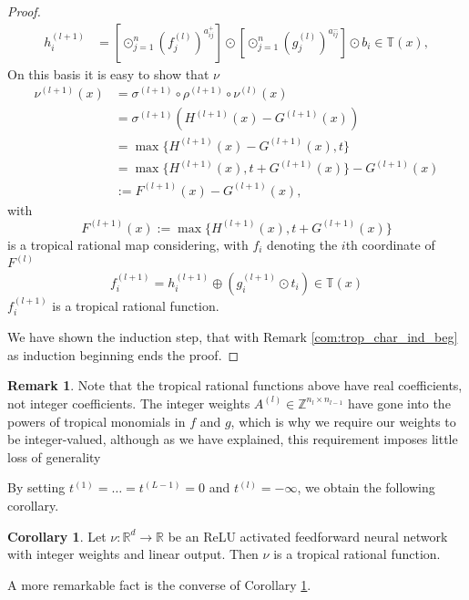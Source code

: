 \documentclass{article}
\theoremstyle{definition}
\newtheorem{corollary}[theorem]{Corollary}
\newtheorem{remark}[theorem]{Remark}
\begin{document}
\begin{proof}
\begin{align*}
h_{i}^{(l+1)} &= [\odot^{n}_{j=1}(f_j^{(l)})^{a_{ij}^{+}}] \odot [\odot^{n}_{j=1}(g_j^{(l)})^{a_{ij}^{-}}] \odot b_{i} \in \mathbb{T}(x),
\end{align*}
On this basis it is easy to show that $\nu$
\begin{align*}
\nu^{(l+1)}(x) 
&= \sigma^{(l+1)} \circ \rho^{(l+1)} \circ \nu^{(l)}(x) \\
&= \sigma^{(l+1)} (H^{(l+1)}(x) - G^{(l+1)}(x)) \\
&= \max\{ H^{(l+1)}(x) - G^{(l+1)}(x), t\} \\
&= \max\{ H^{(l+1)}(x), t + G^{(l+1)}(x)\} - G^{(l+1)}(x) \\
&:= F^{(l+1)}(x) - G^{(l+1)}(x),
\end{align*}
with
$$F^{(l+1)}(x) := \max\{ H^{(l+1)}(x), t + G^{(l+1)}(x)\}$$
is a tropical rational map considering, with $f_{i}$ denoting the $i$th coordinate of $F^{(l)}$
$$f_{i}^{(l+1)} = h_{i}^{(l+1)} \oplus (g_{i}^{(l+1)} \odot t_{i}) \in \mathbb{T}(x)$$
$f_{i}^{(l+1)}$ is a tropical rational function.

We have shown the induction step, that with Remark \ref{com:trop_char_ind_beg} as induction beginning ends the proof.
\end{proof}

\begin{remark}\cite{zhang2018tropical}
Note that the tropical rational functions above have real coefficients, not integer coefficients. The integer weights $A^{(l)} \in \mathbb{Z}^{n_l \times n_{l-1}}$ have gone into the powers of tropical monomials in $f$ and $g$, which is why we require our weights to be integer-valued, although as we have explained, this requirement imposes little loss of generality
\end{remark}

By setting $t^{(1)} = \dots = t^{(L-1)} = 0$ and $t^{(l)} = - \infty$, we obtain the following corollary.

\begin{corollary}\cite{zhang2018tropical}
\label{cor:relu_trop_rat_fkt}
Let $\nu : \mathbb{R}^{d} \to \mathbb{R}$ be an ReLU activated feedforward neural network with integer weights and linear output. Then $\nu$ is a tropical rational function.
\end{corollary}

A more remarkable fact is the converse of Corollary \ref{cor:relu_trop_rat_fkt}.
\end{document}
